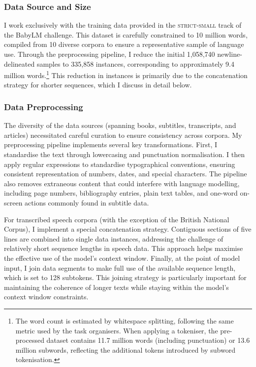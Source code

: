 \subsubsection{Data Source and Size}
I work exclusively with the training data provided in the \textsc{strict-small} track of the BabyLM challenge. This dataset is carefully constrained to 10 million words, compiled from 10 diverse corpora to ensure a representative sample of language use. Through the preprocessing pipeline, I reduce the initial 1,058,740 newline-delineated samples to 335,858 instances, corresponding to approximately 9.4 million words.\footnote{The word count is estimated by whitespace splitting, following the same metric used by the task organisers. When applying a tokeniser, the pre-processed dataset contains 11.7 million words (including punctuation) or 13.6 million subwords, reflecting the additional tokens introduced by subword tokenisation.} This reduction in instances is primarily due to the concatenation strategy for shorter sequences, which I discuss in detail below.

\subsubsection{Data Preprocessing}
The diversity of the data sources (spanning books, subtitles, transcripts, and articles) necessitated careful curation to ensure consistency across corpora. My preprocessing pipeline implements several key transformations. First, I standardise the text through lowercasing and punctuation normalisation. I then apply regular expressions to standardise typographical conventions, ensuring consistent representation of numbers, dates, and special characters. The pipeline also removes extraneous content that could interfere with language modelling, including page numbers, bibliography entries, plain text tables, and one-word on-screen actions commonly found in subtitle data.

For transcribed speech corpora (with the exception of the British National Corpus), I implement a special concatenation strategy. Contiguous sections of five lines are combined into single data instances, addressing the challenge of relatively short sequence lengths in speech data. This approach helps maximise the effective use of the model's context window. Finally, at the point of model input, I join data segments to make full use of the available sequence length, which is set to 128 subtokens. This joining strategy is particularly important for maintaining the coherence of longer texts while staying within the model's context window constraints.


